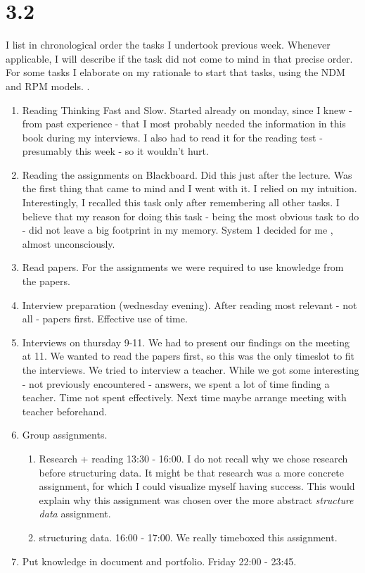 \section*{3.2}
I list in chronological order the tasks I undertook previous week. Whenever applicable, I will describe if the task did not come to mind in that precise order. For some tasks I elaborate on my rationale to start that tasks, using the NDM and RPM models. \cite{ndm}. \\

\begin{enumerate}
	\item Reading Thinking Fast and Slow. Started already on monday, since I knew - from past experience - that I most probably needed the information in this book during my interviews. I also had to read it for the reading test - presumably this week - so it wouldn't hurt.
	\item Reading the assignments on Blackboard. Did this just after the lecture. Was the first thing that came to mind and I went with it. I relied on my intuition. Interestingly, I recalled this task only after remembering all other tasks. I believe that my reason for doing this task - being the most obvious task to do - did not leave a big footprint in my memory. System 1 decided for me \cite{kahneman}, almost unconsciously. 
	\item Read papers. For the assignments we were required to use knowledge from the papers. 
	\item Interview preparation (wednesday evening). After reading most relevant - not all - papers first. Effective use of time.
	\item Interviews on thursday 9-11. We had to present our findings on the meeting at 11. We wanted to read the papers first, so this was the only timeslot to fit the interviews. We tried to interview a teacher. While we got some interesting - not previously encountered - answers, we spent a lot of time finding a teacher. Time not spent effectively. Next time maybe arrange meeting with teacher beforehand.
	\item Group assignments. \begin{enumerate}
		\item Research + reading 13:30 - 16:00. I do not recall why we chose research before structuring data. It might be that research was a more concrete assignment, for which I could visualize myself having success. This would explain why this assignment was chosen over the more abstract \emph{structure data} assignment.
		\item structuring data. 16:00 - 17:00. We really timeboxed this assignment. 
	\end{enumerate}
	\item Put knowledge in document and portfolio. Friday 22:00 - 23:45. 
\end{enumerate}

